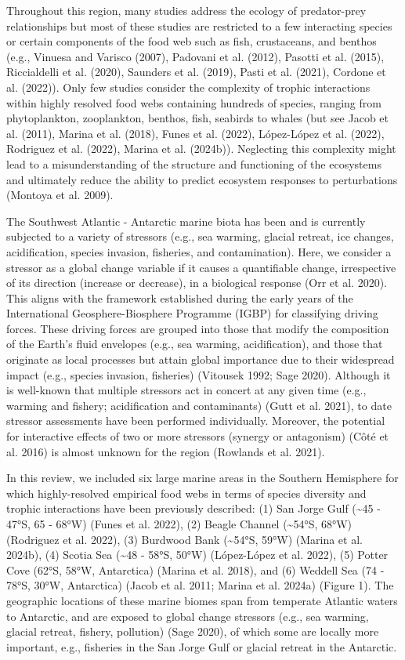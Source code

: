 \documentclass[
]{article}
\begin{document}
Throughout this region, many studies address the ecology of
predator-prey relationships but most of these studies are restricted to
a few interacting species or certain components of the food web such as
fish, crustaceans, and benthos (e.g., Vinuesa and Varisco (2007),
Padovani et al. (2012), Pasotti et al. (2015), Riccialdelli et al.
(2020), Saunders et al. (2019), Pasti et al. (2021), Cordone et al.
(2022)). Only few studies consider the complexity of trophic
interactions within highly resolved food webs containing hundreds of
species, ranging from phytoplankton, zooplankton, benthos, fish,
seabirds to whales (but see Jacob et al. (2011), Marina et al. (2018),
Funes et al. (2022), López-López et al. (2022), Rodriguez et al. (2022),
Marina et al. (2024b)). Neglecting this complexity might lead to a
misunderstanding of the structure and functioning of the ecosystems and
ultimately reduce the ability to predict ecosystem responses to
perturbations (Montoya et al. 2009).

The Southwest Atlantic - Antarctic marine biota has been and is
currently subjected to a variety of stressors (e.g., sea warming,
glacial retreat, ice changes, acidification, species invasion,
fisheries, and contamination). Here, we consider a stressor as a global
change variable if it causes a quantifiable change, irrespective of its
direction (increase or decrease), in a biological response (Orr et al.
2020). This aligns with the framework established during the early years
of the International Geosphere-Biosphere Programme (IGBP) for
classifying driving forces. These driving forces are grouped into those
that modify the composition of the Earth's fluid envelopes (e.g., sea
warming, acidification), and those that originate as local processes but
attain global importance due to their widespread impact (e.g., species
invasion, fisheries) (Vitousek 1992; Sage 2020). Although it is
well-known that multiple stressors act in concert at any given time
(e.g., warming and fishery; acidification and contaminants) (Gutt et al.
2021), to date stressor assessments have been performed individually.
Moreover, the potential for interactive effects of two or more stressors
(synergy or antagonism) (Côté et al. 2016) is almost unknown for the
region (Rowlands et al. 2021).

In this review, we included six large marine areas in the Southern
Hemisphere for which highly-resolved empirical food webs in terms of
species diversity and trophic interactions have been previously
described: (1) San Jorge Gulf (\textasciitilde45 - 47°S, 65 - 68°W)
(Funes et al. 2022), (2) Beagle Channel (\textasciitilde54°S, 68°W)
(Rodriguez et al. 2022), (3) Burdwood Bank (\textasciitilde54°S, 59°W)
(Marina et al. 2024b), (4) Scotia Sea (\textasciitilde48 - 58°S, 50°W)
(López-López et al. 2022), (5) Potter Cove (62°S, 58°W, Antarctica)
(Marina et al. 2018), and (6) Weddell Sea (74 - 78°S, 30°W, Antarctica)
(Jacob et al. 2011; Marina et al. 2024a) (Figure 1). The geographic
locations of these marine biomes span from temperate Atlantic waters to
Antarctic, and are exposed to global change stressors (e.g., sea
warming, glacial retreat, fishery, pollution) (Sage 2020), of which some
are locally more important, e.g., fisheries in the San Jorge Gulf or
glacial retreat in the Antarctic.
\end{document}
